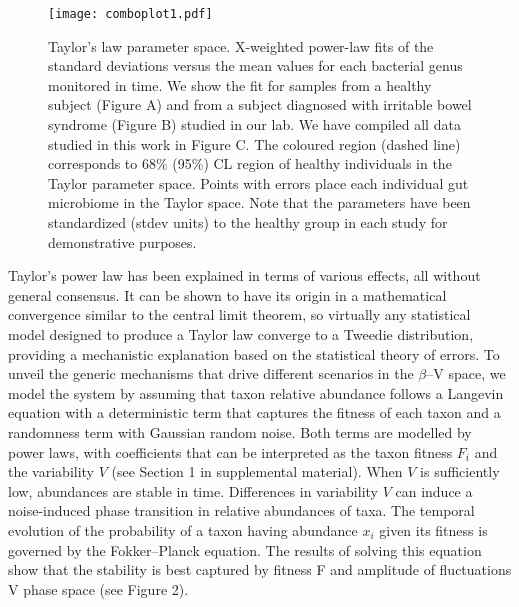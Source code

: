 \documentclass[11pt,oneside,letterpaper]{article}
\begin{document}
\begin{figure}[!ht]
\texttt{[image: comboplot1.pdf]}
\caption{Taylor's law parameter space. X-weighted power-law fits of the standard deviations versus the mean values for each bacterial genus monitored in time. We show the fit for samples from a healthy subject (Figure A) and from a subject diagnosed with irritable bowel syndrome (Figure B) studied in our lab\cite{durban}. We have compiled all data studied in this work in Figure C. The coloured region (dashed line) corresponds to 68\% (95\%) CL region of healthy individuals in the Taylor parameter space. Points with errors place each individual gut microbiome in the Taylor space. Note that the parameters have been standardized (stdev units) to the healthy group in each study for demonstrative purposes.}
\end{figure}

Taylor's power law has been explained in terms of various effects, all without general consensus. It can be shown to have its origin in a mathematical convergence similar to the central limit theorem, so virtually any statistical model designed to produce a Taylor law converge to a Tweedie distribution\cite{stat}, providing a mechanistic explanation based on the statistical theory of errors\cite{convergence1,convergence2,convergence3}. To unveil the generic mechanisms that drive different scenarios in the $\beta$--V space, we model the system by assuming that taxon relative abundance follows a Langevin equation with a deterministic term that captures the fitness of each taxon and a randomness term with Gaussian random noise\cite{ranking}. Both terms are modelled by power laws, with coefficients that can be interpreted as the taxon fitness $F_i$ and the variability $V$ (see Section 1 in supplemental material). When $V$ is sufficiently low, abundances are stable in time.  Differences in variability $V$ can induce a noise-induced phase transition in relative abundances of taxa. The temporal evolution of the probability of a taxon having abundance $x_i$ given its fitness is governed by the Fokker--Planck equation. The results of solving this equation show that  the stability is best captured by fitness F and amplitude of fluctuations V phase space (see Figure 2). 
\end{document}

